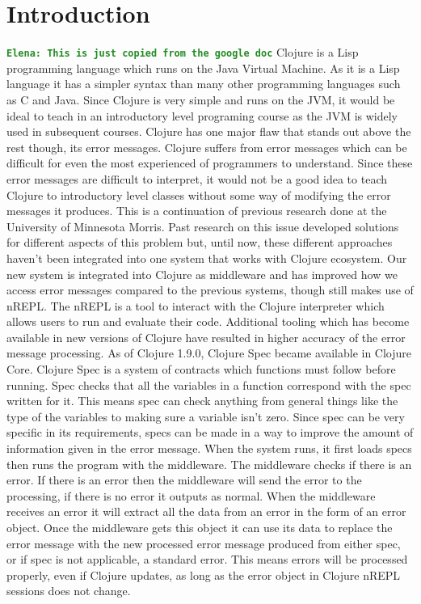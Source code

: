 \documentclass[12pt]{article}
\newcommand{\comment}[1]{{\bf \tt  {#1}}}
\newcommand{\emcomment}[1]{\textcolor{ForestGreen}{\comment{Elena: {#1}}}}
\begin{document}
\section{Introduction}
\emcomment{This is just copied from the google doc}
Clojure is a Lisp programming language which runs on the Java Virtual Machine. As it is a Lisp language it has a simpler syntax than many other programming languages such as C and Java. Since Clojure is very simple and runs on the JVM, it would be ideal to teach in an introductory level programing course as the JVM is widely used in subsequent courses. Clojure has one major flaw that stands out above the rest though, its error messages. Clojure suffers from error messages which can be difficult for even the most experienced of programmers to understand. Since these error messages are difficult to interpret, it would not be a good idea to teach Clojure to introductory level classes without some way of modifying the error messages it produces. 
This is a continuation of previous research done at the University of Minnesota Morris. Past research on this issue developed solutions for different aspects of this problem but, until now, these different approaches haven’t been integrated into one system that works with Clojure ecosystem. Our new system is integrated into Clojure as middleware and has improved how we access error messages compared to the previous systems, though still makes use of nREPL. The nREPL is a tool to interact with the Clojure interpreter which allows users to run and evaluate their code. Additional tooling which has become available in new versions of Clojure have resulted in higher accuracy of the error message processing. 
As of Clojure 1.9.0, Clojure Spec became available in Clojure Core. Clojure Spec is a system of contracts which functions must follow before running. Spec checks that all the variables in a function correspond with the spec written for it. This means spec can check anything from general things like the type of the variables to making sure a variable isn’t zero. Since spec can be very specific in its requirements, specs can be made in a way to improve the amount of information given in the error message. 
When the system runs, it first loads specs then runs the program with the middleware. The middleware checks if there is an error. If there is an error then the middleware will send the error to the processing, if there is no error it outputs as normal. When the middleware receives an error it will extract all the data from an error in the form of an error object. Once the middleware gets this object it can use its data to replace the error message with the new processed error message produced from either spec, or if spec is not applicable, a standard error. This means errors will be processed properly, even if Clojure updates, as long as the error object in Clojure nREPL sessions does not change.  
\end{document}
